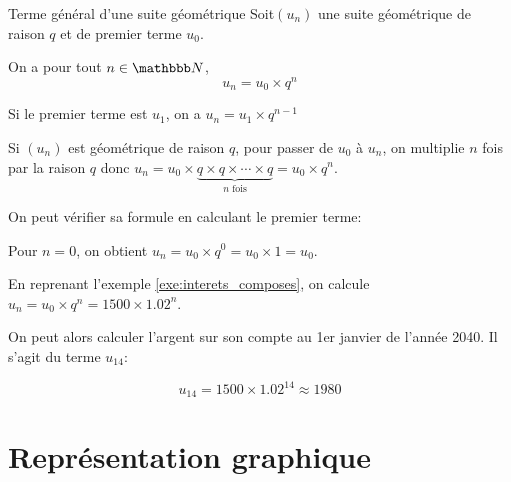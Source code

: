 \documentclass[10pt,a4paper,openany,twoside]{book}
\begin{document}
\begin{theo}{Terme général d'une suite géométrique}{}
Soit$(u_n)$ une suite géométrique de raison $q$ et de premier terme $u_0$.

On a pour tout $n\in\N$, $$u_n=u_0\times q^n$$

Si le premier terme est $u_1$, on a $u_n=u_1\times q^{n-1}$
\end{theo}

\begin{dem}{}{}
Si $(u_n)$ est géométrique de raison $q$, pour passer de $u_0$ à $u_n$, on multiplie $n$ fois par la raison $q$ donc $u_n=u_0\times \underset{n \text{ fois}}{\underbrace{q \times q \times \cdots \times q }}= u_0\times q^n$.
\end{dem}

\begin{rem}{}{}
  On peut vérifier sa formule en calculant le premier terme:

  Pour $n=0$, on obtient $u_n=u_0\times q^0 =u_0 \times 1 = u_0$.
\end{rem}

\begin{ex}{}{}
	En reprenant l'exemple \ref{exe:interets_composes}, on calcule $u_n = u_0\times q^n = 1500\times {1.02}^n$.

	On peut alors calculer l'argent sur son compte au 1er janvier de l'année 2040. Il s'agit du terme $u_{14}$:

	$$u_{14} = 1500 \times {1.02}^{14} \approx 1980$$
\end{ex}

\section{Représentation graphique}
\end{document}
